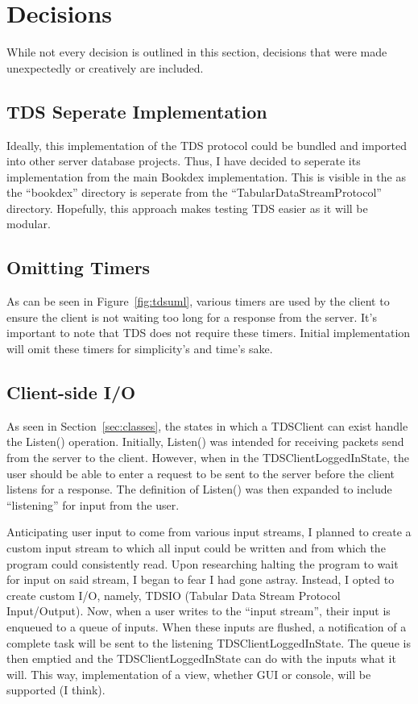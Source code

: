 \documentclass[../design_doc.tex]{subfiles}
\begin{document}
\section{Decisions}\label{sec:dec}
    While not every decision is outlined in this section, decisions that were made unexpectedly or creatively are included.

    \subsection{TDS Seperate Implementation}\label{sec:dec:seperatetds}
        Ideally, this implementation of the TDS protocol could be bundled and imported into other server database projects. Thus, I have decided to seperate its implementation from the main Bookdex implementation. This is visible in the  as the ``bookdex'' directory is seperate from the ``TabularDataStreamProtocol'' directory. Hopefully, this approach makes testing TDS easier as it will be modular.

    \subsection{Omitting Timers}\label{sec:dec:timers}
        As can be seen in Figure~\ref{fig:tdsuml}, various timers are used by the client to ensure the client is not waiting too long for a response from the server. It's important to note that TDS does not require these timers. Initial implementation will omit these timers for simplicity's and time's sake.

    \subsection{Client-side I/O}\label{sec:dec:clientio}
        As seen in Section~\ref{sec:classes}, the states in which a TDSClient can exist handle the Listen() operation. Initially, Listen() was intended for receiving packets send from the server to the client. However, when in the TDSClientLoggedInState, the user should be able to enter a request to be sent to the server before the client listens for a response. The definition of Listen() was then expanded to include ``listening'' for input from the user.

        Anticipating user input to come from various input streams, I planned to create a custom input stream to which all input could be written and from which the program could consistently read. Upon researching halting the program to wait for input on said stream, I began to fear I had gone astray. Instead, I opted to create custom I/O, namely, TDSIO (Tabular Data Stream Protocol Input/Output). Now, when a user writes to the ``input stream'', their input is enqueued to a queue of inputs. When these inputs are flushed, a notification of a complete task will be sent to the listening TDSClientLoggedInState. The queue is then emptied and the TDSClientLoggedInState can do with the inputs what it will. This way, implementation of a view, whether GUI or console, will be supported (I think).
\end{document}
